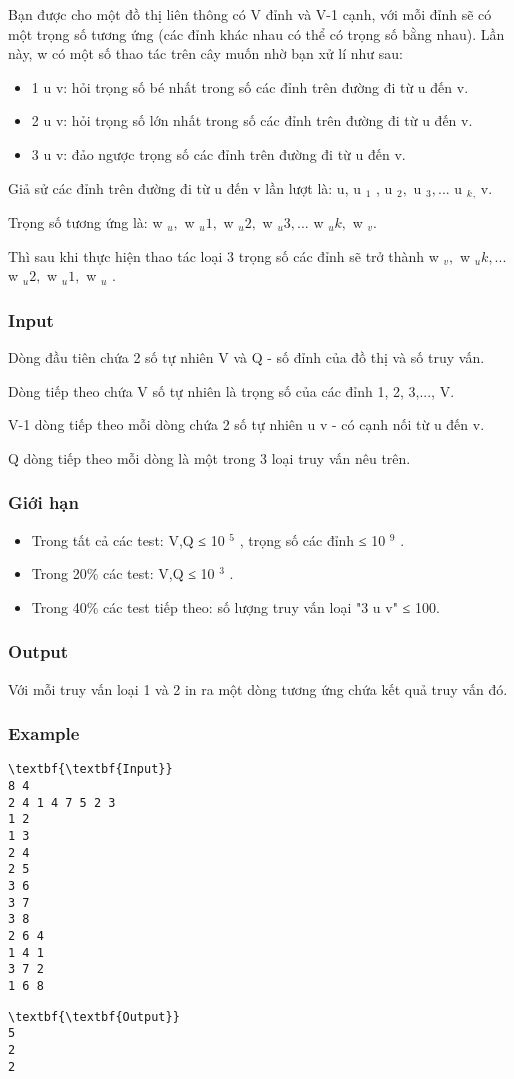 

Bạn được cho một đồ thị liên thông có V đỉnh và V-1 cạnh, với mỗi đỉnh sẽ có một trọng số tương ứng (các đỉnh khác nhau có thể có trọng số bằng nhau). Lần này, w có một số thao tác trên cây muốn nhờ bạn xử lí như sau:
\begin{itemize}
	\item 1 u v: hỏi trọng số bé nhất trong số các đỉnh trên đường đi từ u đến v.
	\item 2 u v: hỏi trọng số lớn nhất trong số các đỉnh trên đường đi từ u đến v.
	\item 3 u v: đảo ngược trọng số các đỉnh trên đường đi từ u đến v.
\end{itemize}

Giả sử các đỉnh trên đường đi từ u đến v lần lượt là: u, u $_ 1 $ , u $_ 2, $ u $_ 3,... $ u $_ k $$_ , $ v.

Trọng số tương ứng là: w $_ u, $ w $_ u1, $ w $_ u2, $ w $_ u3,... $ w $_ uk, $ w $_ v. $

Thì sau khi thực hiện thao tác loại 3 trọng số các đỉnh sẽ trở thành w $_ v, $ w $_ uk,... $ w $_ u2, $ w $_ u1, $ w $_ u $ .

\subsubsection{Input}

Dòng đầu tiên chứa 2 số tự nhiên V và Q - số đỉnh của đồ thị và số truy vấn.

Dòng tiếp theo chứa V số tự nhiên là trọng số của các đỉnh 1, 2, 3,..., V.

V-1 dòng tiếp theo mỗi dòng chứa 2 số tự nhiên u v - có cạnh nối từ u đến v.

Q dòng tiếp theo mỗi dòng là một trong 3 loại truy vấn nêu trên.

\subsubsection{Giới hạn}
\begin{itemize}
	\item Trong tất cả các test: V,Q ≤ 10 $^ 5 $ , trọng số các đỉnh ≤ 10 $^ 9 $ .
	\item Trong 20\% các test: V,Q ≤ 10 $^ 3 $ .
	\item Trong 40\% các test tiếp theo: số lượng truy vấn loại "3 u v" ≤ 100.
\end{itemize}

\subsubsection{Output}

Với mỗi truy vấn loại 1 và 2 in ra một dòng tương ứng chứa kết quả truy vấn đó.

\subsubsection{Example}
\begin{verbatim}
\textbf{\textbf{Input}}
8 4
2 4 1 4 7 5 2 3
1 2
1 3
2 4
2 5
3 6
3 7
3 8
2 6 4
1 4 1
3 7 2
1 6 8
\end{verbatim}
\begin{verbatim}
\textbf{\textbf{Output}}
5
2
2\end{verbatim}